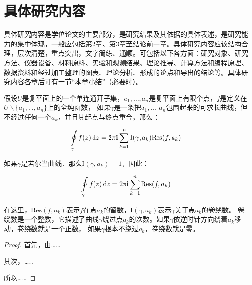 %
%
%
%
%

\chapter{具体研究内容}

具体研究内容是学位论文的主要部分，是研究结果及其依据的具体表述，是研究能力的集中体现，一般应包括第2章、第3章至结论前一章。具体研究内容应该结构合理，层次清楚，重点突出，文字简练、通顺。可包括以下各方面：研究对象、研究方法、仪器设备、材料原料、实验和观测结果、理论推导、计算方法和编程原理、数据资料和经过加工整理的图表、理论分析、形成的论点和导出的结论等。具体研究内容各章后可有一节“本章小结”（必要时）。

\begin{theorem}[留数定理]
\label{thm:res}
  假设$U$是复平面上的一个单连通开子集，$a_1,\ldots,a_n$是复平面上有限个点，$f$是定义在$U\backslash \{a_1,\ldots,a_n\}$上的全纯函数，
  如果$\gamma$是一条把$a_1,\ldots,a_n$包围起来的可求长曲线，但不经过任何一个$a_k$，并且其起点与终点重合，那么：

  \begin{equation}
    \label{eq:res}
    \ointop_{\gamma}f(z)\,\mathrm{d}z = 2\pi\mathbf{i}\sum^n_{k=1}\mathrm{I}(\gamma,a_k)\mathrm{Res}(f,a_k)
  \end{equation}

  如果$\gamma$是若尔当曲线，那么$\mathrm{I}(\gamma, a_k)=1$，因此：

  \begin{equation}
    \label{eq:resthm}
    \ointop_{\gamma}f(z)\,\mathrm{d}z = 2\pi\mathbf{i}\sum^n_{k=1}\mathrm{Res}(f,a_k)
  \end{equation}

  在这里，$\mathrm{Res}(f, a_k)$表示$f$在点$a_k$的留数，$\mathrm{I}(\gamma,a_k)$表示$\gamma$关于点$a_k$的卷绕数。
  卷绕数是一个整数，它描述了曲线$\gamma$绕过点$a_k$的次数。如果$\gamma$依逆时针方向绕着$a_k$移动，卷绕数就是一个正数，
  如果$\gamma$根本不绕过$a_k$，卷绕数就是零。
\end{theorem}

\begin{proof}
  首先，由……

  其次，……

  所以……
  \qedhere
\end{proof}
  
